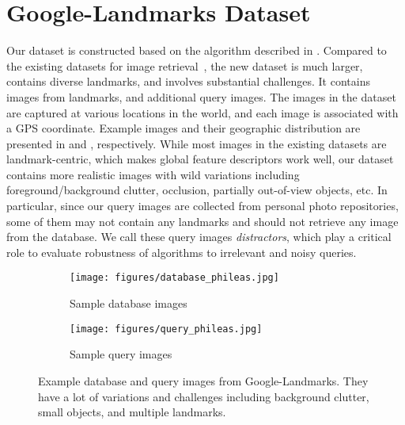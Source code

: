 \documentclass[10pt,twocolumn,letterpaper]{article}
\begin{document}
 

\section{Google-Landmarks Dataset}

Our dataset is constructed based on the algorithm described in \cite{zheng2009tour}.
Compared to the existing datasets for image retrieval~\cite{Philbin07,Philbin2008,Jegou2008}, the new dataset is much larger, contains diverse landmarks, and involves substantial challenges.
It contains  images from  landmarks, and  additional query images.
The images in the dataset are captured at various locations in the world, and each image is associated with a GPS coordinate. 
Example images and their geographic distribution are presented in  and , respectively.
While most images in the existing datasets are landmark-centric, which makes global feature descriptors work well, our dataset contains more realistic images with wild variations including foreground/background clutter, occlusion, partially out-of-view objects, etc.
In particular, since our query images are collected from personal photo repositories, some of them may not contain any landmarks and should not retrieve any image from the database.
We call these query images {\em distractors}, which play a critical role to evaluate robustness of algorithms to irrelevant and noisy queries.
\begin{figure}[t]
\vspace{3pt}
\begin{center}
\begin{subfigure}{1\linewidth}
   \texttt{[image: figures/database\_phileas.jpg]} \vspace{-14pt}
   \caption{\footnotesize Sample database images} \vspace{1pt}
\end{subfigure}
\begin{subfigure}{1\linewidth}
   \texttt{[image: figures/query\_phileas.jpg]} \vspace{-14pt}
   \caption{\footnotesize Sample query images} \vspace{1pt}
\end{subfigure}
\vspace{-8pt}          
\caption{Example database and query images from Google-Landmarks. They have a lot of variations and challenges including background clutter, small objects, and multiple landmarks.}
\vspace{-8pt}          
\label{fig:examples}                                                                                                                                                                                                 
\end{center}
\end{figure}
\end{document}
